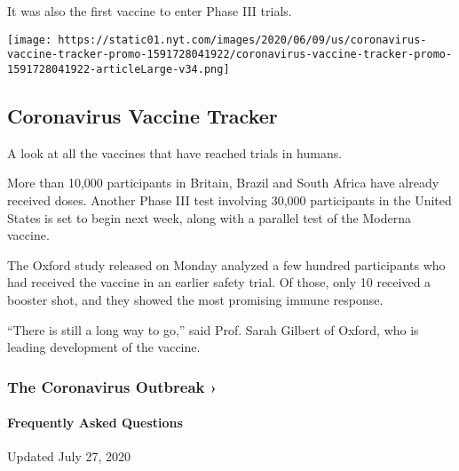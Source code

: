 It was also the first vaccine to enter Phase III trials.

\href{https://www.nytimes.com/interactive/2020/science/coronavirus-vaccine-tracker.html}{}

\texttt{[image: https://static01.nyt.com/images/2020/06/09/us/coronavirus-vaccine-tracker-promo-1591728041922/coronavirus-vaccine-tracker-promo-1591728041922-articleLarge-v34.png]}

\hypertarget{coronavirus-vaccine-tracker}{%
\subsection{Coronavirus Vaccine
Tracker}\label{coronavirus-vaccine-tracker}}

A look at all the vaccines that have reached trials in humans.

More than 10,000 participants in Britain, Brazil and South Africa have
already received doses. Another Phase III test involving 30,000
participants in the United States is set to begin next week, along with
a parallel test of the Moderna vaccine.

The Oxford study released on Monday analyzed a few hundred participants
who had received the vaccine in an earlier safety trial. Of those, only
10 received a booster shot, and they showed the most promising immune
response.

``There is still a long way to go,'' said Prof. Sarah Gilbert of Oxford,
who is leading development of the vaccine.

\href{https://www.nytimes.com/news-event/coronavirus?action=click\&pgtype=Article\&state=default\&region=MAIN_CONTENT_3\&context=storylines_faq}{}

\hypertarget{the-coronavirus-outbreak-}{%
\subsubsection{The Coronavirus Outbreak
›}\label{the-coronavirus-outbreak-}}

\hypertarget{frequently-asked-questions}{%
\paragraph{Frequently Asked
Questions}\label{frequently-asked-questions}}

Updated July 27, 2020

